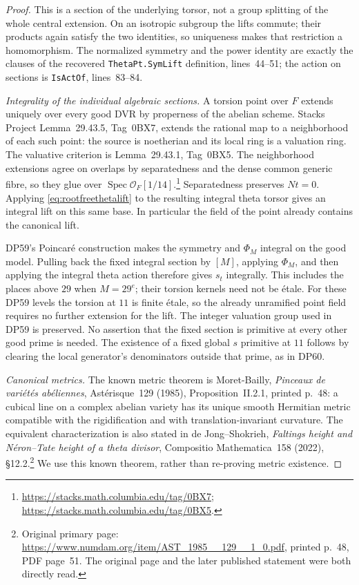 \documentclass[11pt,a4paper]{article}
\theoremstyle{definition}\newtheorem{remark}[theorem]{Remark}
\begin{document}
\begin{proof}
This is a section of the underlying torsor, not a group splitting of the whole central extension.
On an isotropic subgroup the lifts commute; their products again satisfy the two identities, so uniqueness makes that restriction a homomorphism.
The normalized symmetry and the power identity are exactly the clauses of the recovered \texttt{ThetaPt.SymLift} definition, lines~44--51; the action on sections is \texttt{IsActOf}, lines~83--84.

\emph{Integrality of the individual algebraic sections.}
A torsion point over $F$ extends uniquely over every good DVR by properness of the abelian scheme.
Stacks Project Lemma~29.43.5, Tag~0BX7, extends the rational map to a neighborhood of each such point: the source is noetherian and its local ring is a valuation ring.
The valuative criterion is Lemma~29.43.1, Tag~0BX5.
The neighborhood extensions agree on overlaps by separatedness and the dense common generic fibre, so they glue over $\operatorname{Spec}\mathcal O_F[1/14]$.\footnote{\url{https://stacks.math.columbia.edu/tag/0BX7}; \url{https://stacks.math.columbia.edu/tag/0BX5}.}
Separatedness preserves $Nt=0$.
Applying \eqref{eq:rootfreethetalift} to the resulting integral theta torsor gives an integral lift on this same base.
In particular the field of the point already contains the canonical lift.

DP59's Poincar\'e construction makes the symmetry and $\Phi_M$ integral on the good model.
Pulling back the fixed integral section by $[M]$, applying $\Phi_M$, and then applying the integral theta action therefore gives $s_t$ integrally.
This includes the places above $29$ when $M=29^e$; their torsion kernels need not be \'etale.
For these DP59 levels the torsion at $11$ is finite \'etale, so the already unramified point field requires no further extension for the lift.
The integer valuation group used in DP59 is preserved.
No assertion that the fixed section is primitive at every other good prime is needed.
The existence of a fixed global $s$ primitive at $11$ follows by clearing the local generator's denominators outside that prime, as in DP60.

\emph{Canonical metrics.}
The known metric theorem is Moret-Bailly, \emph{Pinceaux de vari\'et\'es ab\'eliennes}, Ast\'erisque~129 (1985), Proposition~II.2.1, printed p.~48: a cubical line on a complex abelian variety has its unique smooth Hermitian metric compatible with the rigidification and with translation-invariant curvature.
The equivalent characterization is also stated in de Jong--Shokrieh, \emph{Faltings height and N\'eron--Tate height of a theta divisor}, Compositio Mathematica~158 (2022), \S12.2.\footnote{Original primary page: \url{https://www.numdam.org/item/AST_1985__129__1_0.pdf}, printed p.~48, PDF page~51. The original page and the later published statement were both directly read.}
We use this known theorem, rather than re-proving metric existence.


\end{proof}
\end{document}
